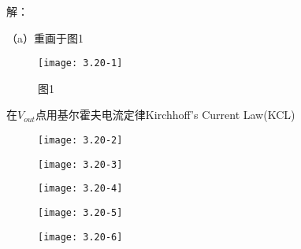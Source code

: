 









解：

\scalebox{3}{（a）}

（a）重画于图1

		\begin{figure}[H] %
	\begin{minipage}{\linewidth}
		\texttt{[image: 3.20-1]}
	\end{minipage}
	\caption*{图1} %
\end{figure}




在$V_{out}$点用基尔霍夫电流定律Kirchhoff’s Current Law(KCL)

		\begin{figure}[H] %
	\begin{minipage}{\linewidth}
		\texttt{[image: 3.20-2]}
	\end{minipage}
\end{figure}

		\begin{figure}[H] %
	\begin{minipage}{\linewidth}
		\texttt{[image: 3.20-3]}
	\end{minipage}
\end{figure}

		\begin{figure}[H] %
	\begin{minipage}{\linewidth}
		\texttt{[image: 3.20-4]}
	\end{minipage}
\end{figure}

		\begin{figure}[H] %
	\begin{minipage}{\linewidth}
		\texttt{[image: 3.20-5]}
	\end{minipage}
\end{figure}

		\begin{figure}[H] %
	\begin{minipage}{\linewidth}
		\texttt{[image: 3.20-6]}
	\end{minipage}
\end{figure}

